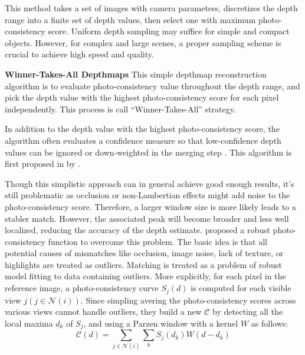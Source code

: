 This method takes a set of images with camera parameters, discretizes the depth range into a finite set of depth values, then select one with maximum photo-consistency score. Uniform depth sampling may suffice for simple and compact objects. However, for complex and large scenes, a proper sampling scheme is crucial to achieve high speed and quality.

\textbf{Winner-Takes-All Depthmaps} This simple depthmap reconstruction algorithm is to evaluate photo-consistency value throughout the depth range, and pick the depth value with the highest photo-consistency score for each pixel independently. This process is call ``Winner-Takes-All'' strategy.


In addition to the depth value with the highest photo-consistency score, the algorithm often evaluates a confidence measure so that low-confidence depth values can be ignored or down-weighted in the merging step \cite{hu2012quantitative}. This algorithm is first proposed in by \citeauthor{esteban2004silhouette}.

Though this simplistic approach can in general achieve good enough results, it's still problematic as occlusion or non-Lambertian effects might add noise to the photo-consistency score. Therefore, a larger window size is more likely leads to a stabler match. However, the associated peak will become broader and less well localized, reducing the accuracy of the depth estimate. \citeauthor{vogiatzis2007multiview} proposed a robust photo-consistency function to overcome this problem. The basic idea is that all potential causes of mismatches like occlusion, image noise, lack of texture, or highlights are treated as outliers. Matching is treated as a problem of robust model fitting to data containing outliers. More explicitly, for each pixel in the reference image, a photo-consistency curve $S_j(d)$ is computed for each visible view $j(j\in\mathcal{N}(i))$. Since simpling avering the photo-consistency scores across various views cannot handle outliers, they build a new $\mathcal{C}$ by detecting all the local maxima $d_k$ of $S_j$, and using a Parzen window with a kernel $W$ as follows:
\begin{equation}
\mathcal{C}(d) = \sum_{j\in\mathcal{N}(i)}\sum_k S_j(d_k)W(d - d_k)
\end{equation}

